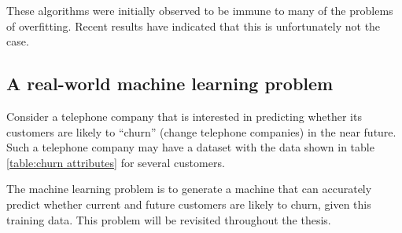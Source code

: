 These algorithms were initially observed to be immune to many of the
problems of overfitting.  Recent results have indicated that this is
unfortunately not the case.

\subsection{A real-world machine learning problem}

Consider a telephone company that is interested in predicting whether
its customers are likely to ``churn'' (change telephone companies) in
the near future.  Such a telephone company may have a dataset with
the data shown in table \ref{table:churn attributes} for several
customers.

The machine learning problem is to generate a machine that can
accurately predict whether current and future customers are likely to
churn, given this training data.  This problem will be revisited
throughout the thesis.


